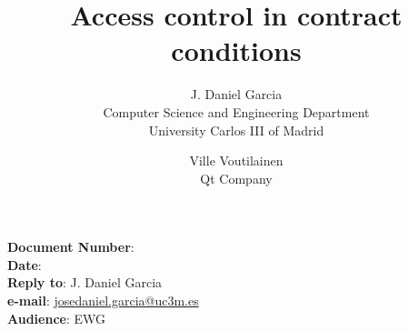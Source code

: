 \documentclass[10pt,a4paper,oneside,final,notitlepage]{article}%
\begin{document}


\noindent
\textbf{Document Number}: \texttt{\paperid}\\
\textbf{Date}: \paperdate\\
\textbf{Reply to}: J. Daniel Garcia\\ 
\textbf{e-mail}: \url{josedaniel.garcia@uc3m.es}\\
\textbf{Audience}: EWG\\

\title{Access control in contract conditions}
\author{J. Daniel Garcia\\
Computer Science and Engineering Department\\
University Carlos III of Madrid
\and
Ville Voutilainen\\
Qt Company
}
\date{}

\begingroup
\let\newpage\relax%
\maketitle
\endgroup





\end{document}

